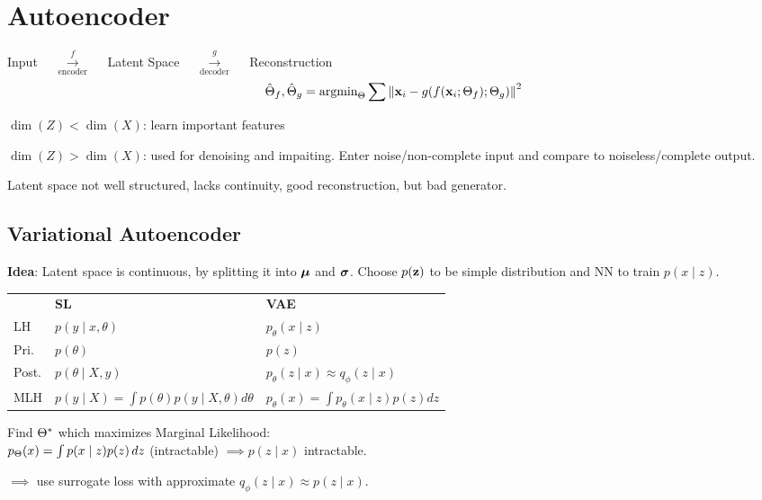 \section{Autoencoder}
\begin{center}
    Input \(\quad\overset{f}{\underset{\text{encoder}}{\to}}\quad\) Latent Space \(\quad\overset{g}{\underset{\text{decoder}}{\to}}\quad\) Reconstruction
\[\hat{\Theta}_f, \hat{\Theta}_g = \text{argmin}_{\Theta} \sum \norm{\vb{x}_i - g(f(\vb{x}_i; \Theta_f); \Theta_g)}^2\]
\end{center}

\begin{definition}[Undercomplete]
    \(\dim(Z) < \dim(X)\): learn important features
\end{definition}

\begin{definition}[Overcomplete]
    \(\dim(Z) > \dim(X)\): used for denoising and impaiting. Enter noise/non-complete input and compare to noiseless/complete output.
\end{definition}

\begin{definition}[AE Limitations]
    Latent space not well structured, lacks continuity, good reconstruction, but bad generator.
\end{definition}

\subsection{Variational Autoencoder}
\textbf{Idea}: Latent space is continuous, by splitting it into \(\vb*{\mu}\) and \(\vb*{\sigma}\).
Choose \(p(\vb{z})\) to be simple distribution and NN to train \(p(x \mid z)\).
\begin{tabular}{@{}lll@{}}
 & \textbf{SL} & \textbf{VAE} \\
LH & $p(y \mid x, \theta)$ & $p_\theta(x \mid z)$ \\
Pri. & $p(\theta)$ & $p(z)$ \\
Post. & $p(\theta \mid X, y)$ & $p_\theta(z \mid x) \approx q_\phi(z \mid x)$ \\
MLH & $p(y \mid X) {\scriptstyle = \int p(\theta) p(y \mid X, \theta) d\theta}$ & $p_\theta(x) = \int p_\theta(x \mid z) p(z) dz$ \\
\end{tabular}

\begin{definition}[Objective]
    Find \(\Theta^*\) which maximizes Marginal Likelihood: \\ \(p_\Theta(x) = \int p(x \mid z) p(z) \, dz\) (intractable) \(\implies p(z \mid x)\) intractable.

    \(\implies\) use surrogate loss with approximate \(q_\phi(z \mid x) \approx p(z \mid x)\).

\end{definition}

